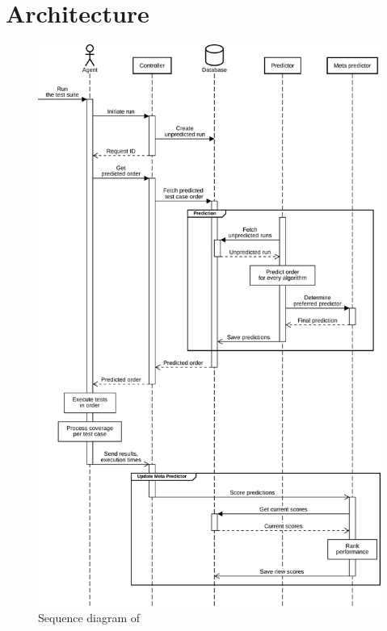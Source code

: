 
\section{Architecture}

\begin{figure}[htbp!]
	\centering
	\includegraphics[height=\textheight]{assets/diagrams/sequence-diagram.pdf}
	\caption{Sequence diagram of \velocity{}}
	\label{fig:velocity-sequence-diagram}
\end{figure}

